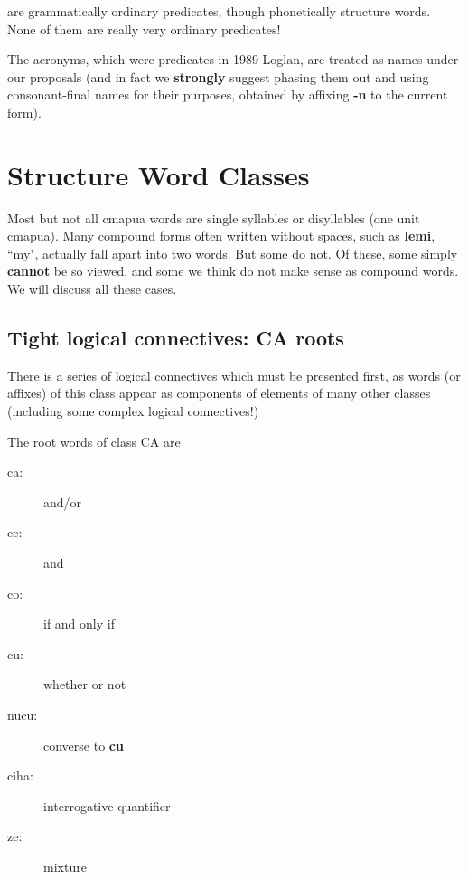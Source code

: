 \documentclass[12pt]{book}
\begin{document}
 are grammatically ordinary predicates, though phonetically structure words.   None of them are really very ordinary predicates!

The acronyms, which were predicates in 1989 Loglan, are treated as names under our proposals (and in fact we {\bf strongly} suggest phasing them out and using consonant-final names for their purposes, obtained by affixing {\bf -n} to the current form).

\section{Structure Word Classes}



Most but not all cmapua words are single syllables or disyllables (one unit cmapua).  Many compound forms often written without spaces, such as {\bf lemi},  ``my", actually fall apart into two words.  But some do not.  Of these, some simply {\bf cannot\/} be so viewed, and some we think  do not make sense as compound words.  We will discuss all these cases.

\subsection{Tight logical connectives:  CA roots}

There is a series of logical connectives which must be presented first, as words (or affixes) of this class appear as components of elements of many other classes
(including some complex logical connectives!)

The root words of class CA are

\begin{description}

\item[ca:]  and/or

\item[ce:] and

\item[co:] if and only if

\item[cu:] whether or not

\item[nucu:]  converse to {\bf cu}

\item[ciha:] interrogative quantifier

\item[ze:]  mixture

\end{description}
\end{document}
